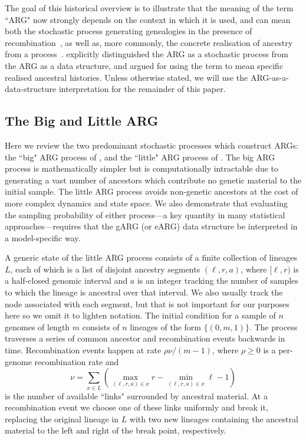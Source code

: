 \documentclass{article}
\begin{document}
The goal of this historical overview is to illustrate that the meaning of the term ``ARG" now strongly
depends on the context in which it is used, and can mean both the
stochastic process generating genealogies in the presence of
recombination~\citep[e.g.][]{nordborg2000linkage,birkner2013ancestral,
wilton2015smc,griffiths2016coalescent},
as well as, more commonly, the concrete realisation of ancestry from a
process~\citep[e.g.][]{gusfield2014recombinatorics,mathieson2020ancestry,brandt2021evaluation}.
\cite{minichiello2006mapping} explicitly distinguished the ARG as a
stochastic process from the ARG as a data structure, and
argued for using the term to mean specific realised ancestral histories.
Unless otherwise stated, we will use the ARG-as-a-data-structure
interpretation for the remainder of this paper.

\subsection*{The Big and Little ARG}
\label{app-big-and-little-arg}

Here we review the two predominant stochastic processes which construct ARGs:
the ``big" ARG process of \cite{griffiths1997ancestral}, and the ``little" ARG process of
 \cite{hudson1983properties}. The big ARG process is mathematically simpler
 but is computationally intractable due to generating a vast number of ancestors
 which contribute no genetic material to the initial sample.
The little ARG process avoids non-genetic ancestors at the cost of more complex
dynamics and state space. We also demonstrate that evaluating the sampling probability
of either process---a key quantity in many statistical approaches---requires that the
gARG (or eARG) data structure be interpreted in a model-specific way.

A generic state of the little ARG process consists of a finite collection of lineages $L$,
each of which is a list of disjoint ancestry segments $(\ell, r, a)$, where
$[\ell, r)$ is a half-closed genomic interval and $a$ is an integer
tracking the number of samples to which the lineage is ancestral over that interval.
We also usually track the node associated with each segment, but
that is not important for our purposes here so we omit it to lighten notation.
The initial condition for a sample of $n$ genomes of length $m$ consists of $n$ lineages
of the form $\{(0, m, 1)\}$. The process traverses a series of common ancestor and
recombination events backwards in time.
Recombination events happen at rate $\rho \nu / (m - 1)$,
where $\rho \geq 0$ is a per-genome recombination rate and
 \[
 \nu = \sum_{x \in L}\left( \max_{(\ell, r, a) \in x}r
     - \min_{(\ell, r, a) \in x}\ell - 1 \right)
 \]
 is the number of available ``links" surrounded by ancestral material.
 At a recombination event we choose one of these links uniformly and break it,
 replacing the original lineage in $L$ with two new lineages containing the ancestral material
 to the left and right of the break point, respectively.
\end{document}
